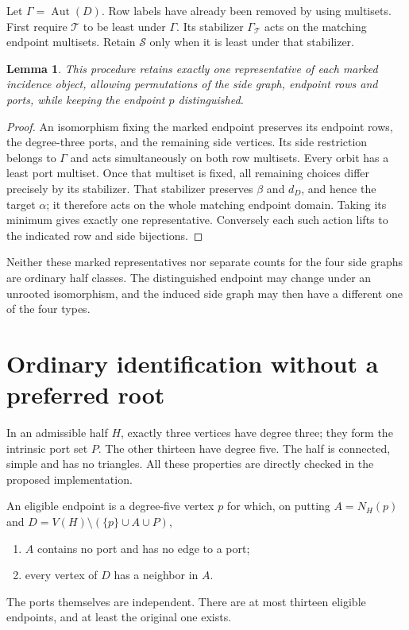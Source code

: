 \documentclass[11pt]{article}
\newtheorem{lemma}[theorem]{Lemma}
\begin{document}
Let $\Gamma=\operatorname{Aut}(D)$. Row labels have already been removed
by using multisets. First require $\mathcal T$ to be least under
$\Gamma$. Its stabilizer $\Gamma_{\mathcal T}$ acts on the matching
endpoint multisets. Retain $\mathcal S$ only when it is least under
that stabilizer.

\begin{lemma}\label{marked}
This procedure retains exactly one representative of each marked
incidence object, allowing permutations of the side graph, endpoint rows
and ports, while keeping the endpoint $p$ distinguished.
\end{lemma}
\begin{proof}
An isomorphism fixing the marked endpoint preserves its endpoint rows,
the degree-three ports, and the remaining side vertices. Its side
restriction belongs to $\Gamma$ and acts simultaneously on both row
multisets. Every orbit has a least port multiset. Once that multiset is
fixed, all remaining choices differ precisely by its stabilizer. That
stabilizer preserves $\beta$ and $d_D$, and hence the target $\alpha$;
it therefore acts on the whole matching endpoint domain. Taking its
minimum gives exactly one representative. Conversely each such action
lifts to the indicated row and side bijections.
\end{proof}

Neither these marked representatives nor separate counts for the four
side graphs are ordinary half classes. The distinguished endpoint may
change under an unrooted isomorphism, and the induced side graph may
then have a different one of the four types.

\section*{Ordinary identification without a preferred root}

In an admissible half $H$, exactly three vertices have degree three;
they form the intrinsic port set $P$. The other thirteen have degree
five. The half is connected, simple and has no triangles. All these
properties are directly checked in the proposed implementation.

An eligible endpoint is a degree-five vertex $p$ for which, on putting
$A=N_H(p)$ and $D=V(H)\setminus(\{p\}\cup A\cup P)$,
\begin{enumerate}
\item $A$ contains no port and has no edge to a port;
\item every vertex of $D$ has a neighbor in $A$.
\end{enumerate}
The ports themselves are independent. There are at most thirteen
eligible endpoints, and at least the original one exists.
\end{document}
